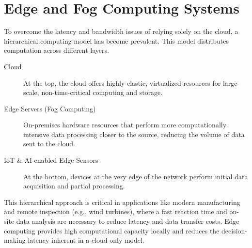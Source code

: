 \section{Edge and Fog Computing Systems}
To overcome the latency and bandwidth issues of relying solely on the cloud, a hierarchical computing model has become prevalent. This model distributes computation across different layers.

\begin{description}
    \item[Cloud] At the top, the cloud offers highly elastic, virtualized resources for large-scale, non-time-critical computing and storage.
    \item[Edge Servers (Fog Computing)] On-premises hardware resources that perform more computationally intensive data processing closer to the source, reducing the volume of data sent to the cloud.
    \item[IoT \& AI-enabled Edge Sensors] At the bottom, devices at the very edge of the network perform initial data acquisition and partial processing.
\end{description}

This hierarchical approach is critical in applications like modern manufacturing and remote inspection (e.g., wind turbines), where a fast reaction time and on-site data analysis are necessary to reduce latency and data transfer costs. Edge computing provides high computational capacity locally and reduces the decision-making latency inherent in a cloud-only model.